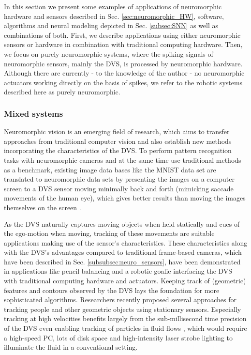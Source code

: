 In this section we present some examples of applications of neuromorphic hardware and sensors described in Sec. \ref{sec:neuromorphic_HW}, software, algorithms and neural modeling depicted in Sec. \ref{subsec:SNN} as well as combinations of both.
First, we describe applications using either neuromorphic sensors or hardware in combination with traditional computing hardware.
Then, we focus on purely neuromorphic systems, where the spiking signals of neuromorphic sensors, mainly the \ac{DVS}, is processed by neuromorphic hardware.
Although there are currently - to the knowledge of the author - no neuromorphic actuators working directly on the basis of spikes, we refer to the robotic systems described here as purely neuromorphic.

\subsubsection{Mixed systems}
\label{subsubsec:mixed_sys}

Neuromorphic vision \cite{Tan2015} is an emerging field of research, which aims to transfer approaches from traditional computer vision and also establish new methods incorporating the characteristics of the \ac{DVS}.
To perform pattern recognition tasks with neuromorphic cameras and at the same time use traditional methods as a benchmark, existing image data bases like the \ac{MNIST} data set \cite{LeCun1998} are translated to neuromorphic data sets by presenting the images on a computer screen to a \ac{DVS} sensor moving minimally back and forth \cite{Orchard2015} (mimicking saccade movements of the human eye), which gives better results than moving the images themselves on the screen \cite{Serrano-Gotarredona2013}.

As the \ac{DVS} naturally captures moving objects when held statically and cues of the ego-motion when moving, tracking of these movements are suitable applications making use of the sensor's characteristics.
These characteristics along with the \ac{DVS}'s advantages compared to traditional frame-based cameras, which have been described in Sec. \ref{subsubsec:neuro_sensors}, have been demonstrated in applications like pencil balancing \cite{Conradt2009} and a robotic goalie \cite{Delbruck2013} interfacing the \ac{DVS} with traditional computing hardware and actuators.
Keeping track of (geometric) features \cite{Lagorce2015} and contours \cite{Barranco2014} observed by the \ac{DVS} lays the foundation for more sophisticated algorithms.
Researchers recently proposed several approaches for tracking people \cite{Schraml2010, Piatkowska2012} and other geometric objects \cite{ReverterValeiras2016} using stationary sensors.
Especially tracking at high velocities \cite{Saner2014} benefits largely from the sub-millisecond time precision of the \ac{DVS} even enabling tracking of particles in fluid flows \cite{Drazen2011}, which would require a high-speed PC, lots of disk space and high-intensity laser strobe lighting to illuminate the fluid in a conventional setting.

